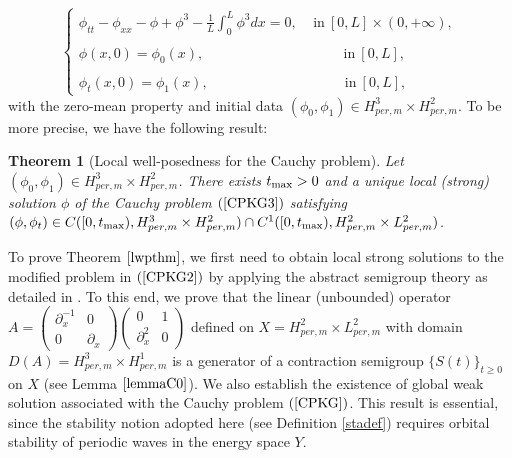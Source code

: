 \documentclass[12pt,reqno,a4paper]{amsart} %
\numberwithin{equation}{section}
\numberwithin{figure}{section}
\newtheorem{theorem}{Theorem}[section]
\begin{document}
\begin{equation}\label{CPKG3}
\left\{\begin{array}{llll}
\displaystyle\phi_{tt}-\phi_{xx}-\phi+\phi^3-\frac{1}{L}\int_0^L\phi^3dx=0, \:\:\:\: \:\text{in} \: [0,L]\times(0,+\infty), \\\\
\phi(x,0)=\phi_0(x),\:\:\:\:\:\:\:\:\:\:\:\:\:\:\:\:\:\:\:\:\:\:\:\:\:\:\:\:\:\:\:\:\:\:\:\:\:\:\:\:\:\:\:\:\: \text{in} \: [0,L],\\\\
\phi_t(x,0)= \phi_1(x),\:\:\:\:\:\:\:\:\:\:\:\:\:\:\:\:\:\:\:\:\:\:\:\:\:\:\:\:\:\:\:\:\:\:\:\:\:\:\:\:\:\:\:\:\text{in} \: [0,L],
\end{array}\right.
\end{equation}
with the zero-mean property and initial data $(\phi_0,\phi_1)\in H_{per,m}^3\times H_{per,m}^2$. To be more precise, we have the following result:


\begin{theorem}[Local well-posedness for the Cauchy problem]\label{lwpthm}
Let $(\phi_0,\phi_1)\in H_{per,m}^3\times H_{per,m}^2$. There exists $t_{\rm{max}}>0$ and a unique  local (strong) solution $\phi$ of the Cauchy problem $(\ref{CPKG3})$ satisfying $(\phi,\phi_t)\in C([0,t_{\rm{max}}),H_{per,m}^3\times H_{per,m}^2)\cap C^1([0,t_{\rm{max}}),H_{per,m}^2\times L_{per,m}^2) $. %
\end{theorem}
To prove Theorem $\ref{lwpthm}$, we first need to obtain local strong solutions to the modified problem in $(\ref{CPKG2})$ by applying the abstract semigroup theory as detailed in \cite[Chapter 1, Chapter 6]{pazy}. To this end, we prove that the linear (unbounded) operator
$\displaystyle A=\left(\begin{array}{lll}\partial_x^{-1}&  0\\ 0&  \partial_x\end{array}\right)\left(\begin{array}{lll}0&  1\\ \partial_x^2&  0\end{array}\right)$  defined on $X=H_{per,m}^2\times L_{per,m}^2$ with domain $D(A)=H_{per,m}^3\times H_{per,m}^1$ is a generator of a contraction semigroup $\{S(t)\}_{t\geq0}$ on $X$ (see Lemma $\ref{lemmaC0}$). We also establish the existence of global weak solution associated with the Cauchy problem $(\ref{CPKG})$. This result is essential, since the stability notion adopted here (see Definition \ref{stadef}) requires orbital stability of periodic waves in the energy space  $Y$.
\end{document}
